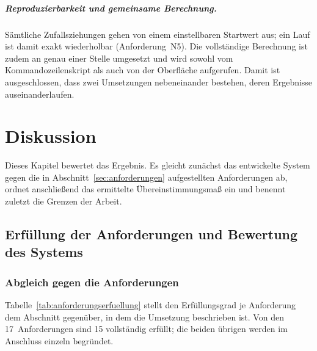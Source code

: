 \documentclass[12pt,a4paper]{report}
\begin{document}
\paragraph{Reproduzierbarkeit und gemeinsame Berechnung.} Sämtliche Zufallsziehungen gehen
von einem einstellbaren Startwert aus; ein Lauf ist damit exakt wiederholbar
(Anforderung~N5). Die vollständige Berechnung ist zudem an genau einer Stelle umgesetzt und
wird sowohl vom Kommandozeilenskript als auch von der Oberfläche aufgerufen. Damit ist
ausgeschlossen, dass zwei Umsetzungen nebeneinander bestehen, deren Ergebnisse auseinanderlaufen.

\chapter{Diskussion}
\label{chap:diskussion}

Dieses Kapitel bewertet das Ergebnis. Es gleicht zunächst das entwickelte System gegen die in
Abschnitt~\ref{sec:anforderungen} aufgestellten Anforderungen ab, ordnet anschließend das
ermittelte Übereinstimmungsmaß ein und benennt zuletzt die Grenzen der Arbeit.

\section{Erfüllung der Anforderungen und Bewertung des Systems}
\label{sec:anforderungserfuellung}

\subsection{Abgleich gegen die Anforderungen}
\label{subsec:abgleich}

Tabelle~\ref{tab:anforderungserfuellung} stellt den Erfüllungsgrad je Anforderung dem
Abschnitt gegenüber, in dem die Umsetzung beschrieben ist. Von den 17~Anforderungen sind 15
vollständig erfüllt; die beiden übrigen werden im Anschluss einzeln begründet.
\end{document}
